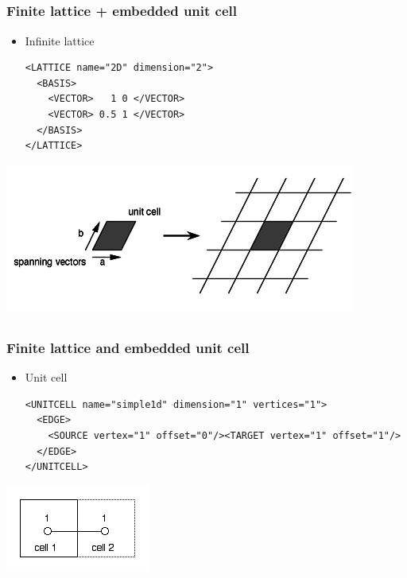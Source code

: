 \subsection*{\redm\whiteb\greenb}
\begin{frame}[t,fragile]
  \frametitle{Finite lattice + embedded unit cell}
  \begin{itemize}
  \item Infinite lattice
  \begin{lstlisting}
<LATTICE name="2D" dimension="2">
  <BASIS>
    <VECTOR>   1 0 </VECTOR>
    <VECTOR> 0.5 1 </VECTOR>
  </BASIS>
</LATTICE>
\end{lstlisting}
  \end{itemize}
  \begin{center}
    \includegraphics[height=0.3\textheight]{TutorialLatticeHOWTOLattice1}
  \end{center}
\end{frame}

\subsection*{\redm\whiteb\greenb}
\begin{frame}[t, fragile]
  \frametitle{Finite lattice and embedded unit cell}
  \begin{itemize}
  \item Unit cell
  \begin{lstlisting}
<UNITCELL name="simple1d" dimension="1" vertices="1">
  <EDGE>
    <SOURCE vertex="1" offset="0"/><TARGET vertex="1" offset="1"/>
  </EDGE>
</UNITCELL>
\end{lstlisting}
  \end{itemize}
  \begin{center}
    \includegraphics[height=0.25\textheight]{TutorialLatticeHOWTOLatticegraph3}
  \end{center}
\end{frame}

